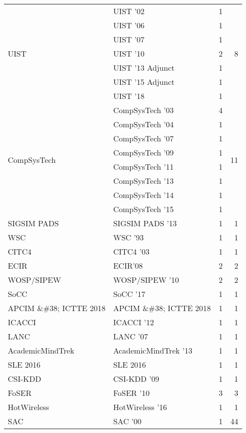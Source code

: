 \begin{table*}[t]
\begin{tabular}{llrr}
\multirow{7}{*}{UIST } & UIST '02 & 1 & \multirow{7}{*}{8}\\
& UIST '06 & 1 &\\
& UIST '07 & 1 &\\
& UIST '10 & 2 &\\
& UIST '13 Adjunct & 1 &\\
& UIST '15 Adjunct & 1 &\\
& UIST '18 & 1 &\\
\multirow{8}{*}{CompSysTech } & CompSysTech '03 & 4 & \multirow{8}{*}{11}\\
& CompSysTech '04 & 1 &\\
& CompSysTech '07 & 1 &\\
& CompSysTech '09 & 1 &\\
& CompSysTech '11 & 1 &\\
& CompSysTech '13 & 1 &\\
& CompSysTech '14 & 1 &\\
& CompSysTech '15 & 1 &\\
\multirow{1}{*}{SIGSIM PADS } & SIGSIM PADS '13 & 1 & \multirow{1}{*}{1}\\
\multirow{1}{*}{WSC } & WSC '93 & 1 & \multirow{1}{*}{1}\\
\multirow{1}{*}{CITC4 } & CITC4 '03 & 1 & \multirow{1}{*}{1}\\
\multirow{1}{*}{ECIR} & ECIR'08 & 2 & \multirow{1}{*}{2}\\
\multirow{1}{*}{WOSP/SIPEW } & WOSP/SIPEW '10 & 2 & \multirow{1}{*}{2}\\
\multirow{1}{*}{SoCC } & SoCC '17 & 1 & \multirow{1}{*}{1}\\
\multirow{1}{*}{APCIM \&\#38; ICTTE 2018} & APCIM \&\#38; ICTTE 2018 & 1 & \multirow{1}{*}{1}\\
\multirow{1}{*}{ICACCI } & ICACCI '12 & 1 & \multirow{1}{*}{1}\\
\multirow{1}{*}{LANC } & LANC '07 & 1 & \multirow{1}{*}{1}\\
\multirow{1}{*}{AcademicMindTrek } & AcademicMindTrek '13 & 1 & \multirow{1}{*}{1}\\
\multirow{1}{*}{SLE 2016} & SLE 2016 & 1 & \multirow{1}{*}{1}\\
\multirow{1}{*}{CSI-KDD } & CSI-KDD '09 & 1 & \multirow{1}{*}{1}\\
\multirow{1}{*}{FoSER } & FoSER '10 & 3 & \multirow{1}{*}{3}\\
\multirow{1}{*}{HotWireless } & HotWireless '16 & 1 & \multirow{1}{*}{1}\\
\multirow{18}{*}{SAC } & SAC '00 & 1 & \multirow{18}{*}{44}\\

\end{tabular}
\end{table*}

